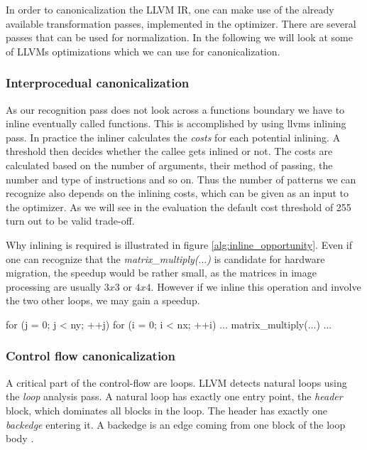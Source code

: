 In order to canonicalization the LLVM IR, one can make use of the already available transformation passes, implemented in the optimizer. There are several passes that can be used for normalization. In the following we will look at some of LLVMs optimizations which we can use for canonicalization.

\subsubsection{Interprocedual canonicalization}
As our recognition pass does not look across a functions boundary we have to inline eventually called functions. This is accomplished by using llvms inlining pass. In practice the inliner calculates the \textit{costs} for each potential inlining. A threshold then decides whether the callee gets inlined  or not. The costs are calculated based on the number of arguments, their method of passing, the number and type of instructions and so on. Thus the number of patterns we can recognize also depends on the inlining costs, which can be given as an input to the optimizer. As we will see in the evaluation the default cost threshold of 255 turn out to be valid trade-off.

Why inlining is required is illustrated in figure \ref{alg:inline_opportunity}. Even if one can recognize that the \textit{matrix\_multiply($\dots$)} is candidate for hardware migration, the speedup would be rather small, as the matrices in image processing are usually $3x3$ or $4x4$. However if we inline this operation and involve the two other loops, we may gain a speedup.

\begin{algorithm}[mathescape, caption={Potential inlining opportunity}, label={alg:inline_opportunity}]
for (j = 0; j < ny; ++j){
	for (i = 0; i < nx; ++i) {
	$\dots$
	matrix_multiply($\dots$)
	$\dots$
	}
}
\end{algorithm}

\subsubsection{Control flow canonicalization}

A critical part of the control-flow are loops. LLVM detects natural loops using the \textit{loop} analysis pass. A natural loop has exactly one entry point, the \textit{header} block, which dominates all blocks in the loop. The header has exactly one \textit{backedge} entering it. A backedge is an edge coming from one block of the loop body \cite[p.662-665]{aho2014compilers}. \\

